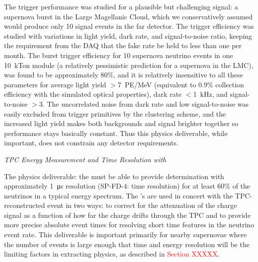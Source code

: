 

The  trigger performance was studied for a plausible but challenging signal: a supernova burst in the Large Magellanic Cloud, which we conservatively assumed would produce only 10 signal events in the far detector. The trigger efficiency was studied with variations in light yield, dark rate, and signal-to-noise ratio, keeping the requirement from the DAQ that the fake rate be held to less than one per month. The burst trigger efficiency for 10 supernova neutrino events in one \SI{10}{kTon} module (a relatively pessimistic prediction for a supernova in the LMC), was found to be approximately $80\%$, and it is relatively insensitive to all these parameters for average light yield $>$\SI{7}{PE/MeV} (equivalent to 0.9\% collection efficiency with the simulated optical properties), dark rate $<$\SI{1}{kHz}, and signal-to-noise $>3$. The uncorrelated noise from dark rate and low signal-to-noise was easily excluded from trigger primitives by the clustering scheme, and the increased light yield makes both backgrounds and signal brighter together so performance stays basically constant. Thus this physics deliverable, while important, does not constrain any detector requirements.


\textit{TPC Energy Measurement and Time Resolution with \tzero}

The physics deliverable: the  must be able to provide \tzero determination with approximately \SI{1}{\micro s} resolution (SP-FD-4: time resolution) for at least 60\% of the neutrinos in a typical  energy spectrum. The \tzero's are used in concert with the TPC-reconstructed event in two ways: to correct for the attenuation of the charge signal as a function of how far the charge drifts through the TPC and to provide more precise absolute event times for resolving short time features in the  neutrino event rate. This deliverable is important primarily for nearby supernovae where the number of events is large enough that time and energy resolution will be the limiting factors in extracting physics, as described in \textcolor{red}{Section XXXXX}. 


